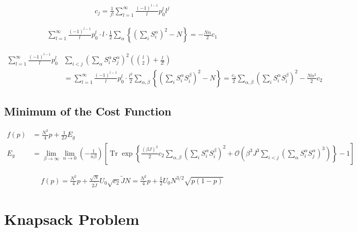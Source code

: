 \documentclass{article}
\begin{document}
\begin{align*}
c_j = \frac{1}{j!} \sum_{l=1}^{\infty} \frac{(-1)^{l-1}}{l} p_0^l l^j \tag{9.20}
\end{align*}

\begin{align*}
\sum_{l=1}^{\infty} \frac{(-1)^{l-1}}{l} p_{0}^{l} \cdot l \cdot \frac{1}{2} \sum_{\alpha}\left\{\left(\sum_{i} S_{i}^{\alpha}\right)^{2}-N\right\}=-\frac{N n}{2} c_{1}
\tag{9.21}
\end{align*}

\begin{align*}
\sum_{l=1}^{\infty} \frac{(-1)^{l-1}}{l} p_{0}^{l} & \sum_{i<j}\left(\sum_{\alpha} S_{i}^{\alpha} S_{j}^{\alpha}\right)^{2}\left(\binom{l}{2}+\frac{l}{2!}\right) \\
& = \sum_{l=1}^{\infty} \frac{(-1)^{l-1}}{l} p_{0}^{l} \cdot \frac{l^{2}}{2} \sum_{\alpha, \beta}\left\{\left(\sum_{i} S_{i}^{\alpha} S_{i}^{\beta}\right)^{2}-N\right\} = \frac{c_{2}}{2} \sum_{\alpha, \beta}\left(\sum_{i} S_{i}^{\alpha} S_{i}^{\beta}\right)^{2}-\frac{N n^{2}}{2} c_{2}
\tag{9.22}
\end{align*}

\subsection{Minimum of the Cost Function}

\begin{align*}
f(p) &= \frac{N^2}{4} p + \frac{1}{2J} E_g \\
E_g &= \lim_{\beta \to \infty} \lim_{n \to 0} \left( -\frac{1}{n \beta} \right) \left[ \operatorname{Tr} \exp \left\{ \frac{(\beta J)^2}{2} c_2 \sum_{\alpha,\beta} \left( \sum_i S_i^\alpha S_i^\beta \right)^2 + \mathcal{O} \left( \beta^3 J^3 \sum_{i<j} \left( \sum_\alpha S_i^\alpha S_j^\alpha \right)^3 \right) \right\} - 1 \right]
\tag{9.23}
\end{align*}

\begin{align*}
f(p)=\frac{N^{2}}{4} p+\frac{\sqrt{N}}{2 \tilde{J}} U_{0} \sqrt{c_{2}} \tilde{J} N=\frac{N^{2}}{4} p+\frac{1}{2} U_{0} N^{3 / 2} \sqrt{p(1-p)}
\tag{9.24}
\end{align*}

\clearpage

\section{Knapsack Problem}
\end{document}
